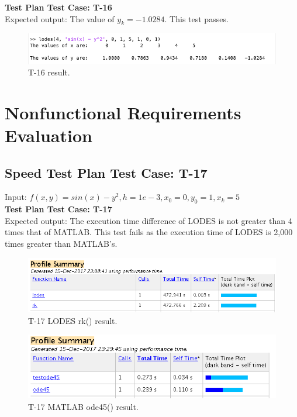 \documentclass[12pt, titlepage]{article}
\newcommand{\famname}{LODES} %
\begin{document}
\textbf{Test Plan Test Case: T-16}\\
Expected output: The value of $y_k = -1.0284$. This test passes.\\
\begin{figure}[H]
 \includegraphics[width=\linewidth]{images/T16}
  \caption{T-16 result.}
  \label{fig:T16}
\end{figure}

\section{Nonfunctional Requirements Evaluation} \label{sec_nfr}
\subsection{Speed Test Plan Test Case: T-17}
Input: $f(x,y) = sin(x) - y^2, h = 1e-3, x_0 = 0,y_0 = 1,x_k = 5$\\

\textbf{Test Plan Test Case: T-17}\\
Expected output: The execution time difference of \famname{} is not greater than 4 times that of MATLAB.
This test fails as the execution time of \famname{} is 2,000 times greater than MATLAB's.\\
\begin{figure}[H]
 \includegraphics[width=\linewidth]{images/T17a}
  \caption{T-17 \famname{} rk() result.}
  \label{fig:T17a}
\end{figure}
\begin{figure}[H]
 \includegraphics[width=\linewidth]{images/T17b}
  \caption{T-17 MATLAB ode45() result.}
  \label{fig:T17b}
\end{figure}
\end{document}
